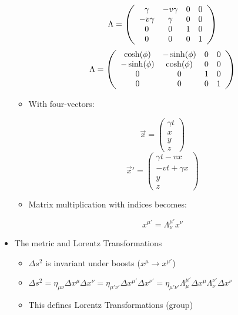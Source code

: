 \begin{itemize}
\begin{itemize}
        $$\Lambda=\left( \begin{array}{c c c c} \gamma & -v\gamma & 0 & 0\\ -v\gamma & \gamma & 0 & 0\\ 0 & 0 & 1 & 0\\ 0 & 0 & 0 & 1\end{array} \right)$$
        $$\Lambda=\left( \begin{array}{c c c c} \cosh(\phi) & -\sinh(\phi) & 0 & 0\\ -\sinh(\phi) & \cosh(\phi) & 0 & 0\\ 0 & 0 & 1 & 0\\ 0 & 0 & 0 & 1\end{array} \right)$$

        \item With four-vectors:

          $$\vec{x}=\left( \begin{array}{c} \gamma t\\ x\\ y\\ z\end{array} \right)$$
          $$\vec{x}'=\left( \begin{array}{c} \gamma t - vx\\ -vt+\gamma x\\ y\\ z\end{array} \right)$$

        \item Matrix multiplication with indices becomes:

          $$x^{\mu'}=\Lambda^{\mu'}_{\nu}x^{\nu}$$

    \end{itemize}

  \item The metric and Lorentz Transformations

    \begin{itemize}

      \item $\Delta s^2$ is invariant under boosts ($x^{\mu}\to x^{\mu'}$)

      \item $\Delta s^2=\eta_{\mu\nu}\Delta x^{\mu}\Delta x^{\nu}=\eta_{\mu'\nu'}\Delta x^{\mu'}\Delta x^{\nu'}=\eta_{\mu'\nu'}\Lambda^{\mu'}_{\mu}\Delta x^{\mu}\Lambda^{\nu'}_{\nu}\Delta x^{\nu}$

      \item This defines Lorentz Transformations (group)


\end{itemize}
\end{itemize}
